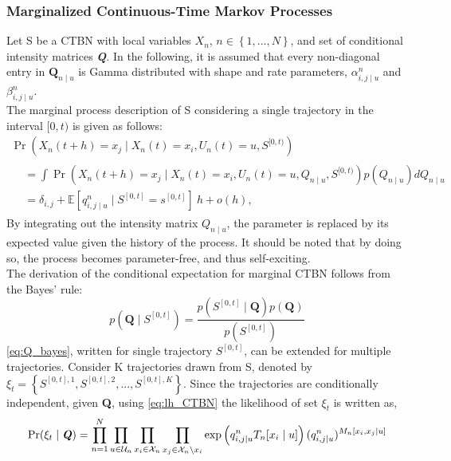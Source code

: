\subsubsection{Marginalized Continuous-Time Markov Processes}
Let S be a CTBN with local variables $ X_n $, $ n\in \left\lbrace 1,...,N \right\rbrace $, and set of conditional intensity matrices \textbf{\textit{Q}}. In the following, it is assumed that every non-diagonal entry in $ \textbf{Q}_{n\mid u} $ is Gamma distributed with shape and rate parameters, $ \alpha^n_{i,j\mid u} $ and $ \beta^n_{i,j\mid u} $.\\
The marginal process description of S considering a single trajectory in the interval $ [0,t) $ is given as follows:
\begin{multline}
\operatorname{Pr}(X_n(t + h) = x_j \mid X_n(t)=x_i, U_n(t)=u, S^{[0, t)})\\
\begin{split}
&= \int \operatorname{Pr}(X_n(t + h) = x_j \mid X_n(t)=x_i, U_n(t)=u, Q_{n\mid u}, S^{[0, t)})p(Q_{n\mid u})dQ_{n\mid u}\\
&= \delta_{i,j} + \mathbb{E}[q^n_{i,j\mid u} \mid S^{[0, t]} = s^{[0, t]}]\ h + o(h),
\end{split}
\label{eq:marginal_CTBN}
\end{multline}
By integrating out the intensity matrix $ Q_{n\mid u} $, the parameter is replaced by its expected value given the history of the process. It should be noted that by doing so, the process becomes parameter-free, and thus self-exciting. \\
The derivation of the conditional expectation for marginal CTBN follows from the Bayes' rule:
\begin{equation}
p\left(\textbf{Q} \mid S^{[0,t]}\right)=\frac{p\left(S^{[0,t]} \mid \textbf{Q}\right) p(\textbf{Q})}{p\left(S^{[0,t]}\right)}
\label{eq:Q_bayes}
\end{equation}
\autoref{eq:Q_bayes}, written for single trajectory $ S^{[0,t]} $, can be extended for multiple trajectories. Consider K trajectories drawn from S, denoted by $ \xi_t = \left\lbrace S^{[0,t], 1}, S^{[0,t], 2}, ..., S^{[0,t], K} \right\rbrace  $. Since the trajectories are conditionally independent, given \textbf{Q}, using \autoref{eq:lh_CTBN} the likelihood of set $ \xi_t $ is written as,
\begin{align}
\operatorname{Pr}( \xi_t  \mid \textbf{\textit{Q}} ) = \prod_{n=1}^{N} \prod_{u \in \mathcal{U}_{n}} \prod_{x_i \in \mathcal{X}_{n}} \prod_{x_j \in \mathcal{X}_{n} \backslash x_i}
\exp \left( q_{i,j\mid u}^{n} T_{n}[x_i\mid u]\right) (q_{i,j\mid u}^{n})^{M_{n}[x_i, x_j\mid u]}
\label{eq:lh_dataset_CTBN}
\end{align}
